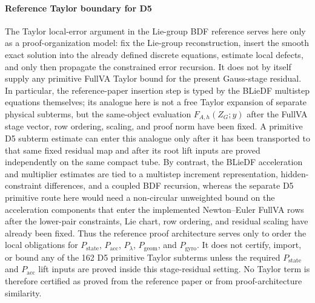 \documentclass[preprint,12pt]{elsarticle}
\begin{document}
\paragraph{Reference Taylor boundary for D5}
The Taylor local-error argument in the Lie-group BDF reference
\cite{wieloch2021bdf} serves here only as a proof-organization model: fix the
Lie-group reconstruction, insert the smooth exact solution into the already
defined discrete equations, estimate local defects, and only then propagate
the constrained error recursion.  It does not by itself supply any primitive
FullVA Taylor bound for the present Gauss-stage residual.  In particular, the
reference-paper insertion step is typed by the BLieDF multistep equations
themselves; its analogue here is not a free Taylor expansion of separate
physical subterms, but the same-object evaluation
\(F_{A,h}(Z_G;y)\) after the FullVA stage vector, row ordering, scaling, and
proof norm have been fixed.  A primitive D5 subterm estimate can enter this
analogue only after it has been transported to that same fixed residual map
and after its root lift inputs are proved independently on the same compact
tube.
By contrast, the
BLieDF acceleration and multiplier estimates are tied to a multistep
increment representation, hidden-constraint differences, and a coupled BDF
recursion, whereas the separate D5 primitive route here would need a
non-circular unweighted bound on the acceleration components that enter the
implemented Newton--Euler FullVA rows after the lower-pair constraints, Lie
chart, row ordering, and residual scaling have already been fixed.  Thus the
reference proof architecture serves only to order the local obligations for
\(P_{\mathrm{state}}\), \(P_{\mathrm{acc}}\), \(P_{\lambda}\),
\(P_{\mathrm{geom}}\), and \(P_{\mathrm{gyro}}\). It does not certify, import,
or bound any of the 162 D5 primitive Taylor subterms unless the required
\(P_{\mathrm{state}}\) and \(P_{\mathrm{acc}}\) lift inputs are proved inside
this stage-residual setting.  No Taylor term is therefore certified as proved
from the reference paper or from proof-architecture similarity.
\end{document}
